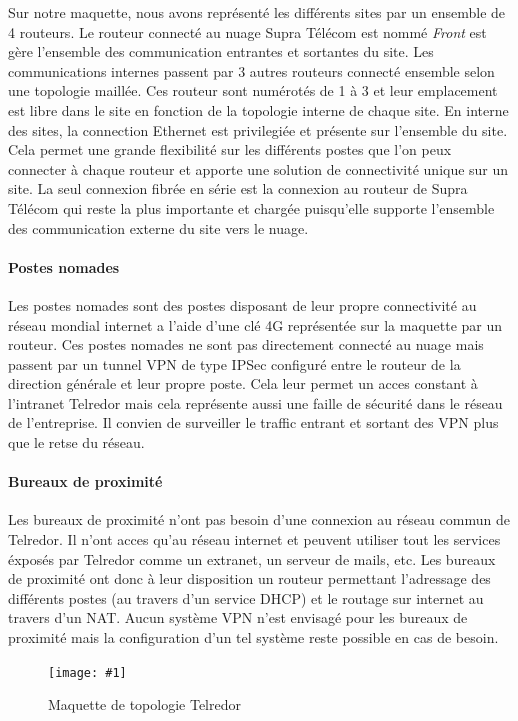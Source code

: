 \documentclass{article}
\newenvironment{figue}[1]{
	\par
	\bigskip
	\begin{figure}[h]
	\begin{center}
	  \texttt{[image: \#1]}
	\end{center}
}{
	\end{figure}
	\bigskip
}
\newcommand{\tlr}{Telredor\xspace}
\newcommand{\spr}{Supra Télécom\xspace}
\begin{document}
Sur notre maquette, nous avons représenté les différents sites par un ensemble de 4 routeurs.
Le routeur connecté au nuage \spr est nommé \emph{Front} est gère l'ensemble des communication entrantes et sortantes du site.
Les communications internes passent par 3 autres routeurs connecté ensemble selon une topologie maillée.
Ces routeur sont numérotés de 1 à 3 et leur emplacement est libre dans le site en fonction de la topologie interne de chaque site.
En interne des sites, la connection Ethernet est privilegiée et présente sur l'ensemble du site.
Cela permet une grande flexibilité sur les différents postes que l'on peux connecter à chaque routeur et apporte une solution de connectivité unique sur un site.
La seul connexion fibrée en série est la connexion au routeur de \spr qui reste la plus importante et chargée puisqu'elle supporte l'ensemble des communication externe du site vers le nuage.

\paragraph{Postes nomades} Les postes nomades sont des postes disposant de leur propre connectivité au réseau mondial internet a l'aide d'une clé 4G représentée sur la maquette par un routeur.
Ces postes nomades ne sont pas directement connecté au nuage mais passent par un tunnel VPN de type IPSec configuré entre le routeur de la direction générale et leur propre poste.
Cela leur permet un acces constant à l'intranet \tlr mais cela représente aussi une faille de sécurité dans le réseau de l'entreprise.
Il convien de surveiller le traffic entrant et sortant des VPN plus que le retse du réseau.

\paragraph{Bureaux de proximité} Les bureaux de proximité n'ont pas besoin d'une connexion au réseau commun de \tlr.
Il n'ont acces qu'au réseau internet et peuvent utiliser tout les services éxposés par \tlr comme un extranet, un serveur de mails, etc.
Les bureaux de proximité ont donc à leur disposition un routeur permettant l'adressage des différents postes (au travers d'un service DHCP) et le routage sur internet au travers d'un NAT.
Aucun système VPN n'est envisagé pour les bureaux de proximité mais la configuration d'un tel système reste possible en cas de besoin.

\clearpage

\begin{figue}{img/telredor.pdf}
	\caption{Maquette de topologie \tlr}
\end{figue}
\end{document}
